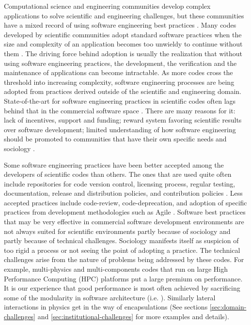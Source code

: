 \label{sec:introduction}
Computational science and engineering communities develop
complex applications to solve scientific and engineering challenges,
but these communities have a mixed record of using software
engineering best practices
\cite{hannay2009,Nguyen-Hoan}. Many codes developed by
scientific communities adopt standard software practices when the size
and complexity of an application becomes too unwieldy to continue
without them \cite{cc2012}. The driving force behind adoption is
usually the realization that without using software engineering
practices, the development, the verification and the maintenance of
applications can become intractable. As more codes cross the threshold
into increasing complexity, software engineering processes are being
adopted from practices derived outside of the scientific and
engineering domain. State-of-the-art for software engineering
practices in scientific codes often lags behind that in the commercial
software space \cite{basili2008understanding, hochstein2008asc,segal2008developing}. 
There are many reasons for it: lack of incentives, support and
funding; reward system favoring scientific results over software 
development; limited understanding of how software engineering
should be promoted to communities that have their own 
specific needs and sociology \cite{carver2007software,Heroux2009}.

Some software engineering practices have been better accepted 
among the developers of scientific codes than others. The ones that are
used quite often include repositories for code version control,
licensing process, regular testing, documentation, release and distribution
policies, and contribution policies \cite{ carver2012software, carver2007software,
cc2012, Dubey2014}. Less accepted practices include code-review,
code-deprecation, and adoption of specific practices from development
methodologies such as Agile \cite{agile}. Software best practices that may be very effective in commercial
software development environments are not always suited for scientific
environments partly because of sociology and partly because of technical
challenges. Sociology manifests itself as suspicion of too rigid a
process or not seeing the point of adopting a practice. The
technical challenges arise from the nature of problems being addressed by
these codes. For example, multi-physics and multi-components  
codes that run on large High Performance Computing 
(HPC) platforms put a large premium on performance. It is our
experience that good performance is most often achieved by sacrificing
some of the modularity in software architecture
(i.e. \cite{Dubey1999}). Similarly lateral interactions in physics get
in the way of encapsulations (See sections \ref{sec:domain-challenges}
and \ref{sec:institutional-challenges} for more examples and details).

